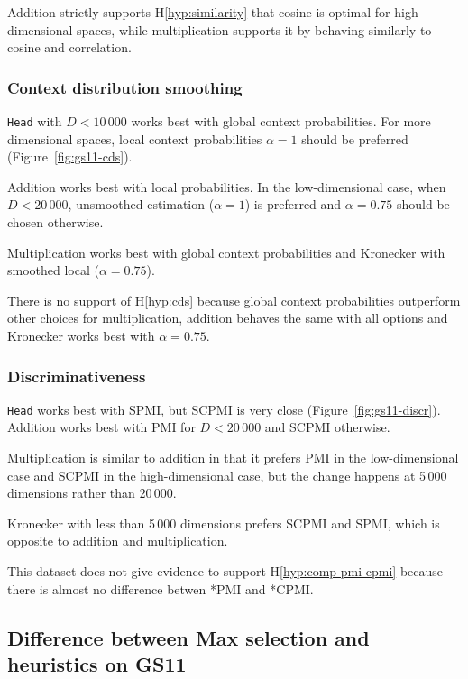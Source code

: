 Addition strictly supports H\ref{hyp:similarity} that cosine is optimal for high-dimensional spaces, while multiplication supports it by behaving similarly to cosine and correlation.

\subsubsection{Context distribution smoothing}

\texttt{Head} with $D < 10\,000$ works best with global context probabilities. For more dimensional spaces, local context probabilities $\alpha = 1$ should be preferred (Figure~\ref{fig:gs11-cds}).

Addition works best with local probabilities. In the low-dimensional case, when $D < 20\,000$, unsmoothed estimation ($\alpha = 1$) is preferred and $\alpha = 0.75$ should be chosen otherwise.

Multiplication works best with global context probabilities and Kronecker with smoothed local ($\alpha = 0.75$).

There is no support of H\ref{hyp:cds} because global context probabilities outperform other choices for multiplication, addition behaves the same with all options and Kronecker works best with $\alpha = 0.75$.

\subsubsection{Discriminativeness}



\texttt{Head} works best with SPMI, but SCPMI is very close (Figure~\ref{fig:gs11-discr}). Addition works best with PMI for $D < 20\,000$ and SCPMI otherwise.

Multiplication is similar to addition in that it prefers PMI in the low-dimensional case and SCPMI in the high-dimensional case, but the change happens at 5\,000 dimensions rather than 20\,000.

Kronecker with less than 5\,000 dimensions prefers SCPMI and SPMI, which is opposite to addition and multiplication.

This dataset does not give evidence to support H\ref{hyp:comp-pmi-cpmi} because there is almost no difference betwen *PMI and *CPMI.

\subsection{Difference between Max selection and heuristics on GS11}


